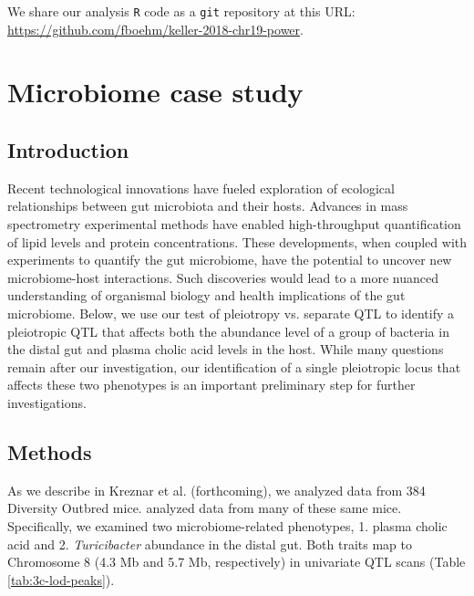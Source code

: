 \documentclass[oneside]{book}
\begin{document}
We share our analysis \texttt{R} code \citep{r} as a \texttt{git} repository at this URL: \url{https://github.com/fboehm/keller-2018-chr19-power}.




\section{Microbiome case study}
\subsection{Introduction}

Recent technological innovations have fueled exploration of ecological relationships between gut microbiota and their hosts. Advances in mass spectrometry experimental methods have enabled high-throughput quantification of lipid levels and protein concentrations. These developments, when coupled with experiments to quantify the gut microbiome, have the potential to uncover new microbiome-host interactions. Such discoveries would lead to a more nuanced understanding of organismal biology and health implications of the gut microbiome. Below, we use our test of pleiotropy vs. separate QTL to identify a pleiotropic QTL that affects both the abundance level of a group of bacteria in the distal gut and plasma cholic acid levels in the host. While many questions remain after our investigation, our identification of a single pleiotropic locus that affects these two phenotypes is an important preliminary step for further investigations.  



\subsection{Methods}

As we describe in Kreznar et al. (forthcoming), we analyzed data from 384 Diversity Outbred mice. \citet{keller2018genetic} analyzed data from many of these same mice. Specifically, we examined two microbiome-related phenotypes, 1. plasma cholic acid and 2. \emph{Turicibacter} abundance in the distal gut. Both traits map to Chromosome 8 (4.3 Mb and 5.7 Mb, respectively) in univariate QTL scans (Table \ref{tab:3c-lod-peaks}).
\end{document}
